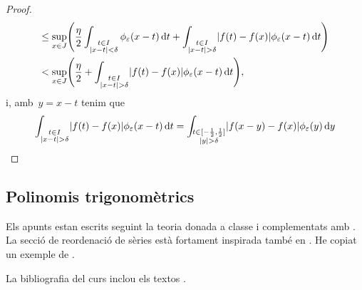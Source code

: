\documentclass[../../main.tex]{subfiles}
\begin{document}
\begin{proof}
\begin{multline*}
             \leq\sup_{x\in J}\left(\frac{\eta}{2}\int_{\substack{t\in I\\\abs{x-t}<\delta}}\phi_{\varepsilon}(x-t)\diff t+\int_{\substack{t\in I\\\abs{x-t}>\delta}}\abs{f(t)-f(x)}\phi_{\varepsilon}(x-t)\diff t\right) \hfill\\
             <\sup_{x\in J}\left(\frac{\eta}{2}+\int_{\substack{t\in I\\\abs{x-t}>\delta}}\abs{f(t)-f(x)}\phi_{\varepsilon}(x-t)\diff t\right), \hfill
         \end{multline*}
         i, amb~\(y=x-t\) tenim que %
         \[
             \int_{\substack{t\in I\\\abs{x-t}>\delta}}\abs{f(t)-f(x)}\phi_{\varepsilon}(x-t)\diff t=\int_{\substack{t\in[-\frac{1}{2},\frac{1}{2}]\\\abs{y}>\delta}}\abs{f(x-y)-f(x)}\phi_{\varepsilon}(y)\diff y
         \]
    \end{proof}
    \subsection{Polinomis trigonomètrics}
    \begin{definition}

    \end{definition}
    \printbibliography
    Els apunts estan escrits seguint la teoria donada a classe i complementats amb \cite{ApuntsMorelo}.
    La secció de reordenació de sèries està fortament inspirada també en \cite{HickmanRiemannSeriesTheoremNotes}.
    He copiat un exemple de \cite{KeithDifferentiatingUnderIntegralSignNotes}.

    La bibliografia del curs inclou els textos \cite{GalindoGuiaPracticaCalculoInfinitesimal,OrtegaIntroduccioAnalisiMatematica,PerelloCalculInfinitesimal,RudinPrinciplesOfMathematicalAnalysis,TolstovFourier}.
\end{document}
